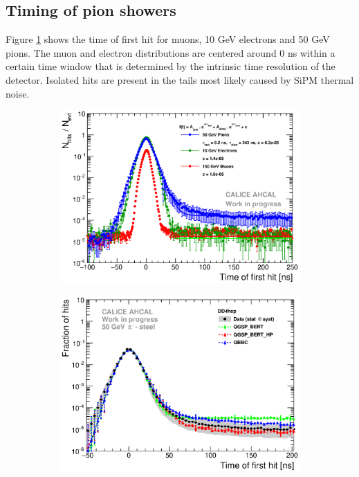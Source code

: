 \documentclass{JINST}
\begin{document}
\subsection{Timing of pion showers}

Figure \ref{fig:dNdt_Data} shows the time of first hit for muons, 10 GeV electrons and 50 GeV pions. The muon and electron distributions are centered around 0 ns within a certain time window that is determined by the intrinsic time resolution of the detector. Isolated hits are present in the tails most likely caused by SiPM thermal noise.

\begin{figure}[htbp!]
  \centering
  \begin{subfigure}[t]{0.49\textwidth}
    \includegraphics[width=1\textwidth]{fig/Timing_dNdt_Comparison.eps}
    \caption{}\label{fig:dNdt_Data}
  \end{subfigure}
  \hfill
  \begin{subfigure}[t]{0.49\textwidth}
    \includegraphics[width=1\textwidth]{fig/Comparison_SimData_Pion50GeV_LateClusters_DD4hep.eps}

\end{subfigure}
\end{figure}
\end{document}
